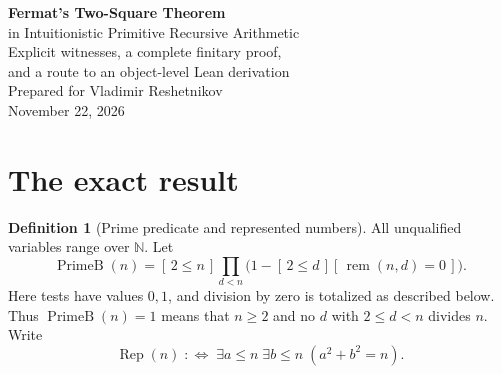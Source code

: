 \documentclass[11pt,letterpaper]{article}
\theoremstyle{definition}
\newtheorem{definition}[theorem]{Definition}
\theoremstyle{remark}
\newcommand{\N}{\mathbb N}
\newcommand{\PrimeB}{\operatorname{PrimeB}}
\newcommand{\remd}{\operatorname{rem}}
\newcommand{\ind}[1]{[\,#1\,]}
\begin{document}
\begin{center}
{\color{ink}\LARGE\bfseries Fermat's Two-Square Theorem}\\[5pt]
{\Large in Intuitionistic Primitive Recursive Arithmetic}\\[10pt]
{\large Explicit witnesses, a complete finitary proof,\\
and a route to an object-level Lean derivation}\\[12pt]
Prepared for Vladimir Reshetnikov\\
November 22, 2026
\end{center}

\begin{abstract}
We prove that a prime \(p\) is a sum of two natural-number squares exactly
when \(p=2\) or \(p\equiv1\pmod4\), using intuitionistic logic and
quantifier-free induction over primitive recursive functions. The positive
direction has explicit primitive recursive witnesses. A bounded inverse
construction proves Wilson's theorem; the half-factorial gives a root of
\(-1\) modulo \(p\); a collision among \(p+1\) points in an integer square
grid produces a positive multiple of \(p\) strictly below \(2p\).
All searches have numerical bounds. We give the finite counting proof
behind the collision step, a second construction by bounded descent, a
ledger of induction invariants, executable exact-arithmetic algorithms,
and a detailed Lean implementation plan using the repository's existing
object-theory arithmetic library.
\end{abstract}

\noindent{}

\clearpage
{\setlength{\parskip}{0pt}\small\tableofcontents}
\clearpage

\section{The exact result}

\begin{definition}[Prime predicate and represented numbers]
All unqualified variables range over \(\N\). Let
\[
 \PrimeB(n)=
 \ind{2\le n}\prod_{d<n}
 \bigl(1-\ind{2\le d}\ind{\remd(n,d)=0}\bigr).
\]
Here tests have values \(0,1\), and division by zero is totalized as described
below. Thus \(\PrimeB(n)=1\) means that \(n\ge2\) and no \(d\) with
\(2\le d<n\) divides \(n\). Write
\[
 \operatorname{Rep}(n)\;:\Longleftrightarrow\;
 \exists a\le n\;\exists b\le n\;(a^2+b^2=n).
\]
\end{definition}
\end{document}
